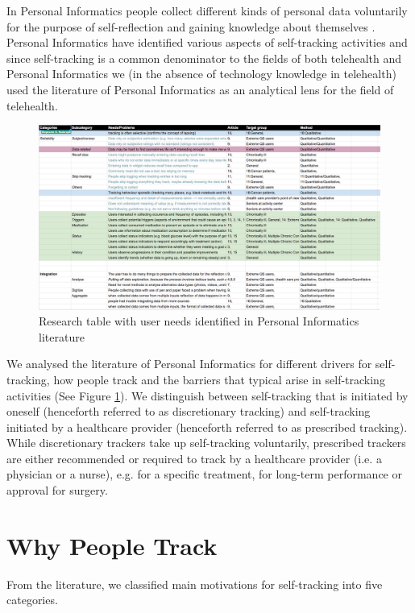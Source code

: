 In Personal Informatics people collect different kinds of personal data voluntarily for the purpose of self-reflection and gaining knowledge about themselves \cite{Li2010}. Personal Informatics have identified various aspects of self-tracking activities \cite{Li2010} and since self-tracking is a common denominator to the fields of both telehealth and Personal Informatics we (in the absence of technology knowledge in telehealth) used the literature of Personal Informatics as an analytical lens for the field of telehealth. 

\begin{figure}[!h] \centering
			\includegraphics[width=1\textwidth]{Images/PI/researchtable.png}
		\caption{Research table with user needs identified in Personal Informatics literature} \label{fig:PI}
\end{figure}

We analysed the literature of Personal Informatics for different drivers for self-tracking, how people track and the barriers that typical arise in self-tracking activities (See Figure \ref{fig:PI}). We distinguish between self-tracking that is initiated by oneself (henceforth referred to as discretionary tracking) and self-tracking initiated by a healthcare provider (henceforth referred to as prescribed tracking). While discretionary trackers take up self-tracking voluntarily, prescribed trackers are either recommended or required to track by a healthcare provider (i.e. a physician or a nurse), e.g. for a specific treatment, for long-term performance or approval for surgery. 

\section{Why People Track} 
From the literature, we classified main motivations for self-tracking into five categories.

